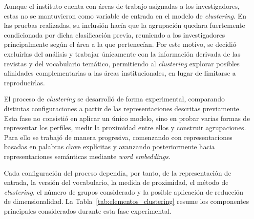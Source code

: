 \documentclass[11pt,spanish,listoffigures,listoftables]{tfgetsinf}
\begin{document}
Aunque el instituto cuenta con áreas de trabajo asignadas a los investigadores, estas no se mantuvieron como variable de entrada en el modelo de \textit{clustering}. En las pruebas realizadas, su inclusión hacía que la agrupación quedara fuertemente condicionada por dicha clasificación previa, reuniendo a los investigadores principalmente según el área a la que pertenecían. Por este motivo, se decidió excluirlas del análisis y trabajar únicamente con la información derivada de las revistas y del vocabulario temático, permitiendo al \textit{clustering} explorar posibles afinidades complementarias a las áreas institucionales, en lugar de limitarse a reproducirlas.

El proceso de \textit{clustering} se desarrolló de forma experimental, comparando distintas configuraciones a partir de las representaciones descritas previamente. Esta fase no consistió en aplicar un único modelo, sino en probar varias formas de representar los perfiles, medir la proximidad entre ellos y construir agrupaciones. Para ello se trabajó de manera progresiva, comenzando con representaciones basadas en palabras clave explícitas y avanzando posteriormente hacia representaciones semánticas mediante \textit{word embeddings}.

Cada configuración del proceso dependía, por tanto, de la representación de entrada, la versión del vocabulario, la medida de proximidad, el método de \textit{clustering}, el número de grupos considerado y la posible aplicación de reducción de dimensionalidad. La Tabla~\ref{tab:elementos_clustering} resume los componentes principales considerados durante esta fase experimental.
\end{document}
